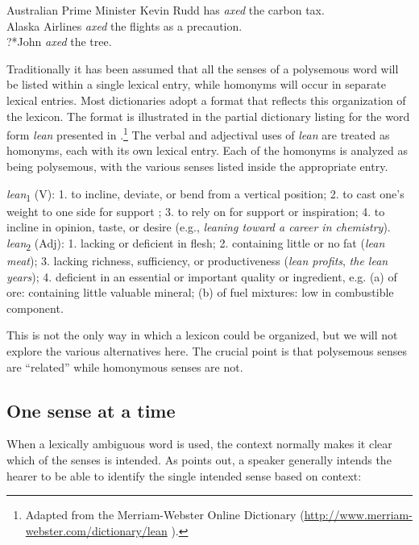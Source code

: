 \ea \label{ex:5.14}
\ea Australian Prime Minister Kevin Rudd has \textit{axed} the carbon tax.\\
\ex Alaska Airlines \textit{axed} the flights as a precaution.\\
\ex ?*John \textit{axed} the tree.
\z \z


Traditionally it has been assumed that all the senses of a polysemous word will be listed within a single lexical entry, while homonyms will occur in separate lexical entries. Most dictionaries adopt a format that reflects this organization of the lexicon. The format is illustrated in the partial dictionary listing for the word form \textit{lean} presented in .\footnote{Adapted from the Merriam-Webster Online Dictionary (\url{http://www.merriam-webster.com/dictionary/lean} ).} The verbal and adjectival uses of \textit{lean} are treated as homonyms, each with its own lexical entry. Each of the homonyms is analyzed as being polysemous, with the various senses listed inside the appropriate entry.


\ea \label{ex:5.15}
\textit{lean}\textsubscript{1} (V): 1. to incline, deviate, or bend from a vertical position; 2. to cast one’s weight to one side for support ; 3. to rely on for support or inspiration; 4. to incline in opinion, taste, or desire (e.g., \textit{leaning toward a career in chemistry}).\\[1.25\baselineskip]

\textit{lean}\textsubscript{2} (Adj): 1. lacking or deficient in flesh; 2. containing little or no fat (\textit{lean meat}); 3. lacking richness, sufficiency, or productiveness (\textit{lean profits}, \textit{the lean years}); 4. deficient in an essential or important quality or ingredient, e.g. (a) of ore: containing little valuable mineral; (b) of fuel mixtures: low in combustible component.
\z


This is not the only way in which a lexicon could be organized, but we will not explore the various alternatives here. The crucial point is that polysemous senses are “related” while homonymous senses are not.


\subsection{One sense at a time}\label{sec:} %

When a lexically ambiguous word is used, the context normally makes it clear which of the senses is intended. As \citet[53]{Cruse1986} points out, a speaker generally intends the hearer to be able to identify the single intended sense based on context:

